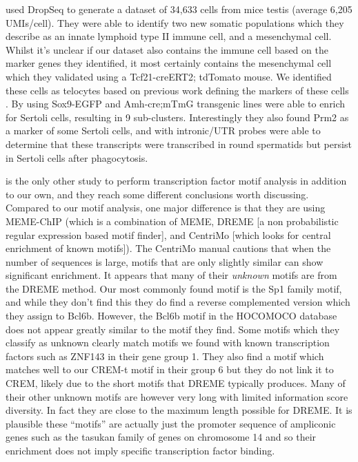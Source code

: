 \cite{Green2018Comprehensive} used DropSeq to generate a dataset of 34,633 cells from mice testis (average 6,205 UMIs/cell).
They were able to identify two new somatic populations which they describe as an innate lymphoid type II immune cell, and a mesenchymal cell.
Whilst it's unclear if our dataset also contains the immune cell based on the marker genes they identified, it most certainly contains the mesenchymal cell which they validated using a Tcf21-creERT2; tdTomato mouse.
We identified these cells as telocytes based on previous work defining the markers of these cells \parencite{Marini2018Reappraising}.
By using Sox9-EGFP and Amh-cre;mTmG transgenic lines \cite{Green2018Comprehensive} were able to enrich for Sertoli cells, resulting in 9 sub-clusters.
Interestingly they also found Prm2 as a marker of some Sertoli cells, and with intronic/UTR probes were able to determine that these transcripts were transcribed in round spermatids but persist in Sertoli cells after phagocytosis.

\cite{Green2018Comprehensive} is the only other study to perform transcription factor motif analysis in addition to our own, and they reach some different conclusions worth discussing.
Compared to our motif analysis, one major difference is that they are using MEME-ChIP (which is a combination of MEME, DREME [a non probabilistic regular expression based motif finder], and CentriMo [which looks for central enrichment of known motifs]).
The CentriMo manual cautions that when the number of sequences is large, motifs that are only slightly similar can show significant enrichment.
It appears that many of their \emph{unknown} motifs are from the DREME method.
 Our most commonly found motif is the Sp1 family motif, and while they don't find this they do find a reverse complemented version which they assign to Bcl6b.
However, the Bcl6b motif in the HOCOMOCO database does not appear greatly similar to the motif they find.
Some motifs which they classify as unknown clearly match motifs we found with known transcription factors such as ZNF143 in their gene group 1.
They also find a motif which matches well to our CREM-t motif in their group 6 but they do not link it to CREM, likely due to the short motifs that DREME typically produces.
Many of their other unknown motifs are however very long with limited information score diversity.
In fact they are close to the maximum length possible for DREME.
It is plausible these ``motifs'' are actually just the promoter sequence of ampliconic genes such as the tasukan family of genes on chromosome 14 and so their enrichment does not imply specific transcription factor binding.

